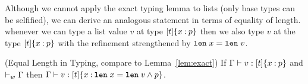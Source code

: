 Although we cannot apply the exact typing lemma to lists (only 
base types can be selfified), we can derive an analogous
statement in terms of equality of length.
%
whenever we can type
a list value $v$ at type ${{[t]}\{x \mathbin{:} p\}}$ then we
also type $v$ at the type ${{[t]}\{x \mathbin{:} p\}}$
with the refinement strengthened by $\mathtt{len}\; x = \mathtt{len}\; v$.
%
\begin{lemma} (Equal Length in Typing, compare to Lemma~\ref{lem:exact}) 
\label{lem:equalLength}
  If ${\mathrm{\Gamma}} \vdash {v} : {{{[t]}\{x \mathbin{:} p\}}}$ and $\vdash_w {\mathrm{\Gamma}}$
  then ${\mathrm{\Gamma}} \vdash {v} : {{{[t]}\{x \mathbin{:} \mathtt{len}\; x = \mathtt{len}\; v \wedge p\}}}$. 
\end{lemma}


\begin{comment}

\mypara{Denotational Soundness}
\label{sec:soundness:denotationalD}
\label{sec:denot:soundnessD}

Our statement of denotational soundness remains the same as
Theorem~\ref{lem:denote-sound-first}.
%
Here we emphasize that 



\begin{lemma}\label{denote-selfification} (Selfified Denotations)
  If $\isWellFormed{\varnothing}{\stype}{\skind}$,
     $\hastype{\varnothing}{\sexpr}{\stype}$,
     $\evalsTo{\sexpr}{\sval}$ for some $\sval \in \denote{\stype}$
  then $\sval \in \denote{\self{t}{e}{k}}$.
\end{lemma}

This lemma captures the intuition
that if $v \in \denote{\breft{\sbase}{x}{p}}$
(\ie if $v$ has base type $\sbase$
and $\evalsTo{\subst{p}{x}{v}}{\ttrue}$),
then we have $v \in \denote{\breft{\sbase}{x}{ p \wedge x = v}}$
as $\subst{(p \wedge x=v)}{x}{v}$ certainly evaluates to $\ttrue$.
%
The full proof also handles the case that $t$
is an existential type as well as selfification
by an expression $e$ that evaluates to $v$.

\end{comment}

